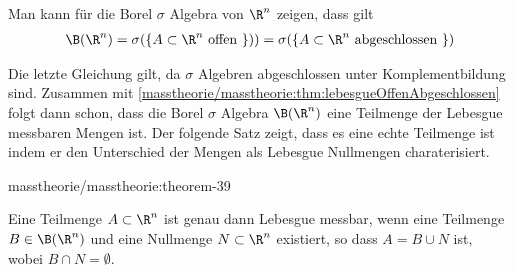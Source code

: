 \documentclass[letterpaper,10pt,english]{jupyterBook}
\begin{document}
\par
Man kann für die Borel \(\sigma\) Algebra von \(\R^n\) zeigen, dass gilt
\begin{align*}
\B(\R^n) = \sigma(\lbrace A \subset \R^n \text{ offen }\rbrace) ) = \sigma(\lbrace A \subset \R^n \text{ abgeschlossen }\rbrace)
\end{align*}
\par
Die letzte Gleichung gilt, da \(\sigma\) Algebren abgeschlossen unter Komplementbildung sind.
Zusammen mit \cref{masstheorie/masstheorie:thm:lebesgueOffenAbgeschlossen} folgt dann schon, dass die Borel \(\sigma\) Algebra \(\B(\R^n)\) eine Teilmenge der Lebesgue messbaren Mengen ist.
Der folgende Satz zeigt, dass es eine echte Teilmenge ist indem er den Unterschied der Mengen als Lebesgue Nullmengen charaterisiert.
\begin{theorem}{}{masstheorie/masstheorie:theorem-39}



\par
Eine Teilmenge \(A \subset \R^n\) ist genau dann Lebesgue messbar, wenn eine Teilmenge \(B \in \B(\R^n)\) und eine Nullmenge \(N \subset \R^n\) existiert, so dass \(A = B \cup N\) ist, wobei \(B\cap N=\emptyset\).
\end{theorem}
\end{document}
